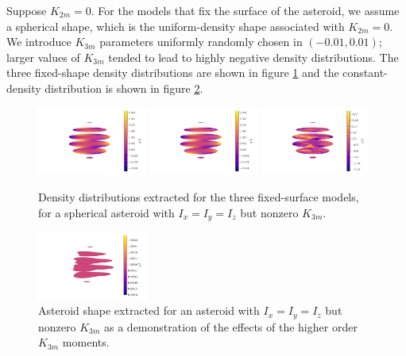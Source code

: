 \documentclass{aastex631}
\begin{document}
Suppose $K_{2m} = 0$. For the models that fix the surface of the asteroid, we assume a spherical shape, which is the uniform-density shape associated with $K_{2m} = 0$. We introduce $K_{3m}$ parameters uniformly randomly chosen in $(-0.01, 0.01)$; larger values of $K_{3m}$ tended to lead to highly negative density distributions. The three fixed-shape density distributions are shown in figure \ref{fig:high-order-fixed} and the constant-density distribution is shown in figure \ref{fig:high-order-surface}.

\begin{figure}
  \centering
  \includegraphics[width=0.32\textwidth]{harmonic-high.pdf}
  \includegraphics[width=0.32\textwidth]{likelihood-high.pdf}
  \includegraphics[width=0.32\textwidth]{ensemble-high.pdf}
  \caption{Density distributions extracted for the three fixed-surface models, for a spherical asteroid with $I_x=I_y=I_z$ but nonzero $K_{3m}$.}
  \label{fig:high-order-fixed}
\end{figure}

\begin{figure}
  \centering
  \includegraphics[width=0.32\textwidth]{surface-high.pdf}
  \caption{Asteroid shape extracted for an asteroid with $I_x = I_y = I_z$ but nonzero $K_{3m}$ as a demonstration of the effects of the higher order $K_{3m}$ moments.}
  \label{fig:high-order-surface}
\end{figure}
\end{document}
